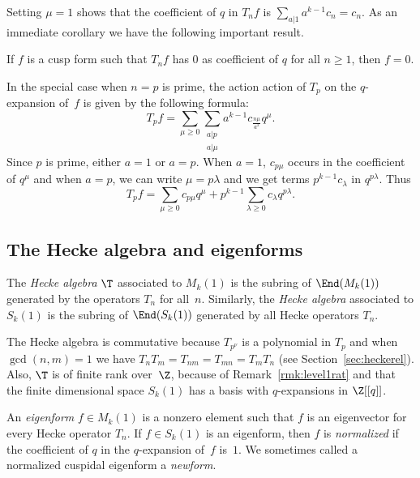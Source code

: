\documentclass{report}
\begin{document}
\begin{remark}\label{rem:hecke_const_coeff}
Setting $\mu=1$ shows that the coefficient of $q$ in $T_n f$ is
$\sum_{a|1}a^{k-1}c_n=c_n$. As an immediate corollary we have the
following important result.
\end{remark}

\begin{corollary}
If $f$ is a cusp form such that $T_n f$ has 0 as coefficient of
$q$ for all $n\geq 1$, then $f=0$.
\end{corollary}


In the special case when $n=p$ is prime, the action action of $T_p$ on
the $q$-expansion of~$f$ is given by the following formula:
$$T_p f = \sum_{\mu\geq 0} \sum_{\substack{a|p\\a|\mu}}a^{k-1}
                         c_{\frac{n\mu}{a^2}} q^{\mu}. $$
Since $p$ is prime, either $a=1$ or $a=p$. When $a=1$,
$c_{p\mu}$ occurs in the coefficient of $q^{\mu}$ and when $a=p$,
we can write $\mu=p\lambda$ and we get terms $p^{k-1}c_{\lambda}$
in $q^{p\lambda}$. Thus
$$T_p f = \sum_{\mu\geq 0}c_{p\mu}q^{\mu}+
          p^{k-1}\sum_{\lambda\geq 0} c_{\lambda}q^{p\lambda}.$$

\subsection{The Hecke algebra and eigenforms}

\begin{definition}
The {\em Hecke algebra} $\T$ associated to $M_k(1)$ is the subring
of $\End(M_k(1))$ generated by the operators $T_n$ for all~$n$.
Similarly, the {\em Hecke algebra} associated to $S_k(1)$ is the
subring of $\End(S_k(1))$ generated by all Hecke operators $T_n$.
\end{definition}
The Hecke algebra is commutative because $T_{p^\nu}$ is a polynomial
in $T_p$ and when $\gcd(n,m)=1$ we have $T_n T_m = T_{nm}=T_{mn} = T_m
T_n$ (see Section~\ref{sec:heckerel}).  Also, $\T$ is of finite rank
over~$\Z$, because of Remark~\ref{rmk:level1rat} and that the finite
dimensional space $S_k(1)$ has a basis with $q$-expansions in
$\Z[[q]]$.


\begin{definition}[Eigenform]
An {\em eigenform} $f\in M_k(1)$ is a nonzero element such that
$f$ is an eigenvector for every Hecke operator $T_n$. If $f\in
S_k(1)$ is an eigenform, then $f$ is {\em normalized} if the
coefficient of $q$ in the $q$-expansion of~$f$ is~$1$.  We
sometimes called a normalized cuspidal eigenform a {\em newform}.
\end{definition}
\end{document}
